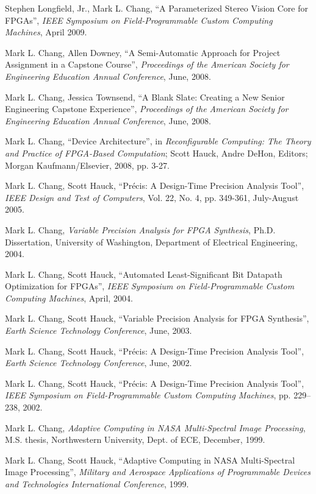 \documentclass[line]{res}
\begin{document}
\begin{resume}
	Stephen Longfield, Jr., Mark L. Chang, ``A Parameterized Stereo Vision Core for \mbox{FPGAs}'', \emph{IEEE Symposium on Field-Programmable Custom Computing Machines}, April 2009.
	
	Mark L. Chang, Allen Downey, ``A Semi-Automatic Approach for Project Assignment in a Capstone Course'', \emph{Proceedings of the American Society for Engineering Education Annual Conference}, June, 2008.
	
	Mark L. Chang, Jessica Townsend, ``A Blank Slate: Creating a New Senior Engineering Capstone Experience'', \emph{Proceedings of the American Society for Engineering Education Annual Conference}, June, 2008.
	
	Mark L. Chang, ``Device Architecture'', in \emph{Reconfigurable Computing: The Theory and Practice of FPGA-Based Computation}; Scott Hauck, Andre DeHon, Editors; Morgan Kaufmann/Elsevier, 2008, pp. 3-27.
	
	Mark L. Chang, Scott Hauck, ``Pr\'{e}cis: A Design-Time Precision Analysis Tool'', \emph{IEEE Design and Test of Computers}, Vol. 22, No. 4, pp. 349-361, July-August 2005.
	
	Mark L. Chang, \emph{Variable Precision Analysis for FPGA Synthesis}, Ph.D. Dissertation, University of Washington, Department of Electrical Engineering, 2004.
	
	Mark L. Chang, Scott Hauck, ``Automated Least-Significant Bit Datapath Optimization for \mbox{FPGAs}'', \emph{IEEE Symposium on Field-Programmable Custom Computing Machines}, April, 2004.
	
	Mark L. Chang, Scott Hauck, ``Variable Precision Analysis for FPGA Synthesis'', \emph{Earth Science Technology Conference}, June, 2003.
	
	Mark L. Chang, Scott Hauck, ``Pr\'{e}cis: A Design-Time Precision Analysis Tool'', \emph{Earth Science Technology Conference}, June, 2002.
	
	Mark L. Chang, Scott Hauck, ``Pr\'{e}cis: A Design-Time Precision Analysis Tool'', \emph{IEEE Symposium on Field-Programmable Custom Computing Machines}, pp. 229--238, 2002.
	
	Mark L. Chang, \emph{Adaptive Computing in NASA Multi-Spectral Image Processing}, M.S. thesis, Northwestern University, Dept. of ECE, December, 1999.
	
	Mark L. Chang, Scott Hauck, ``Adaptive Computing in NASA Multi-Spectral Image Processing'', \emph{Military and Aerospace Applications of Programmable Devices and Technologies International Conference}, 1999.
	

\end{resume}
\end{document}
